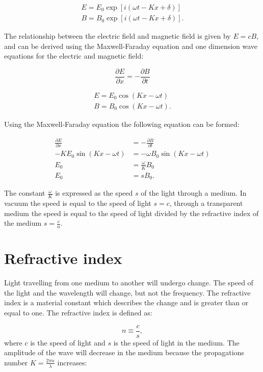 \documentclass[MasterThesisMain.tex]{subfiles}
\begin{document}
\begin{align}
E=E_0\exp[i(\omega t-Kx+\delta)]\\
B=B_0\exp[i(\omega t-Kx+\delta)].
\end{align}

The relationship between the electric field and magnetic field is given by $E=cB$, and can be derived using the Maxwell-Faraday equation and one dimension wave equations for the electric and magnetic field:

\begin{equation}
\frac{\partial E}{\partial x} = - \frac{\partial B}{\partial t}
\end{equation}

\begin{align}
E = E_0 \cos{(Kx-\omega t)}\\
B = B_0 \cos{(Kx-\omega t)}.
\end{align}

Using the Maxwell-Faraday equation the following equation can be formed:

\begin{align}
\frac{\partial E}{\partial x} &= - \frac{\partial B}{\partial t}\\
-K E_0 \sin{(Kx-\omega t)} &= -\omega B_0 \sin{(Kx-\omega t)}\\
E_0 &= \frac{\omega}{K} B_0\\
E_0 &= s B_0.
\end{align} 

The constant $\frac{\omega}{K}$ is expressed as the speed $s$ of the light through a medium. In vacuum the speed is equal to the speed of light $s=c$, through a transparent medium the speed is equal to the speed of light divided by the refractive index of the medium $s =\frac{c}{n}$. 

\section{Refractive index} 
Light travelling from one medium to another will undergo change. The speed of the light and the wavelength will change, but not the frequency. The refractive index is a material constant which describes the change and is greater than or equal to one. The refractive index is defined as:

\begin{equation}
n \equiv \frac{c}{s},
\end{equation}
where $c$ is the speed of light and $s$ is the speed of light in the medium. The amplitude of the wave will decrease in the medium because the propagations number $K=\frac{2\pi n}{\lambda}$ increases: 
\end{document}
